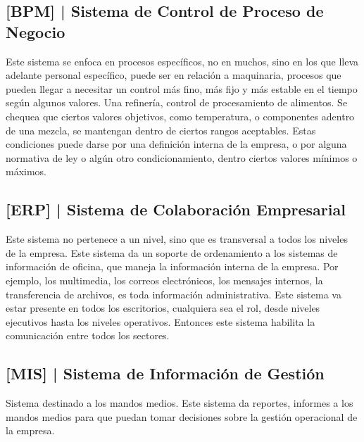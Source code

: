\hypertarget{sistema-de-control-de-proceso-de-negocio-bpm}{%
\subsection{%
{[}BPM{]} |
Sistema de Control de Proceso de Negocio
}\label{sistema-de-control-de-proceso-de-negocio-bpm}}

Este sistema se enfoca en procesos específicos, no en muchos, sino en
los que lleva adelante personal específico, puede ser en relación a
maquinaria, procesos que pueden llegar a necesitar un control más fino,
más fijo y más estable en el tiempo según algunos valores. Una
refinería, control de procesamiento de alimentos. Se chequea que ciertos
valores objetivos, como temperatura, o componentes adentro de una
mezcla, se mantengan dentro de ciertos rangos aceptables. Estas
condiciones puede darse por una definición interna de la empresa, o por
alguna normativa de ley o algún otro condicionamiento, dentro ciertos
valores mínimos o máximos.

\hypertarget{sistema-de-colaboraciuxf3n-empresarial-erp}{%
\subsection{%
{[}ERP{]} |
Sistema de Colaboración Empresarial
}\label{sistema-de-colaboraciuxf3n-empresarial-erp}}

Este sistema no pertenece a un nivel, sino que es transversal a todos
los niveles de la empresa. Este sistema da un soporte de ordenamiento a
los sistemas de información de oficina, que maneja la información
interna de la empresa. Por ejemplo, los multimedia, los correos
electrónicos, los mensajes internos, la transferencia de archivos, es
toda información administrativa. Este sistema va estar presente en todos
los escritorios, cualquiera sea el rol, desde niveles ejecutivos hasta
los niveles operativos. Entonces este sistema habilita la comunicación
entre todos los sectores.

\hypertarget{sistema-de-informaciuxf3n-de-gestiuxf3n-mis}{%
\subsection{%
{[}MIS{]} |
Sistema de Información de Gestión
}\label{sistema-de-informaciuxf3n-de-gestiuxf3n-mis}}

Sistema destinado a los mandos medios. Este sistema da reportes,
informes a los mandos medios para que puedan tomar decisiones sobre la
gestión operacional de la empresa.

